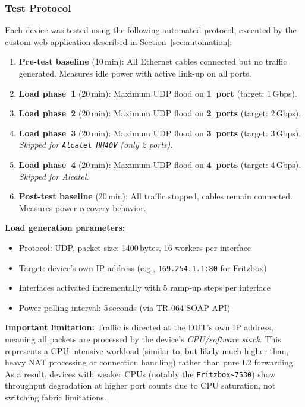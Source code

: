 \subsubsection{Test Protocol}
Each device was tested using the following automated protocol, executed by the custom web application described in Section~\ref{sec:automation}:
\begin{enumerate}
    \item \textbf{Pre-test baseline} (10\,min): All Ethernet cables connected but no traffic generated. Measures idle power with active link-up on all ports.
    \item \textbf{Load phase~1} (20\,min): Maximum \ac{UDP} flood on \textbf{1~port} (target: 1\,Gbps).
    \item \textbf{Load phase~2} (20\,min): Maximum \ac{UDP} flood on \textbf{2~ports} (target: 2\,Gbps).
    \item \textbf{Load phase~3} (20\,min): Maximum \ac{UDP} flood on \textbf{3~ports} (target: 3\,Gbps). \emph{Skipped for \texttt{Alcatel~HH40V} (only 2 ports).}
    \item \textbf{Load phase~4} (20\,min): Maximum \ac{UDP} flood on \textbf{4~ports} (target: 4\,Gbps). \emph{Skipped for Alcatel.}
    \item \textbf{Post-test baseline} (20\,min): All traffic stopped, cables remain connected. Measures power recovery behavior.
\end{enumerate}

\noindent\textbf{Load generation parameters:}
\begin{itemize}
    \item Protocol: \ac{UDP}, packet size: 1400\,bytes, 16 workers per interface
    \item Target: device's own IP address (e.g., \texttt{169.254.1.1:80} for Fritzbox)
    \item Interfaces activated incrementally with 5 ramp-up steps per interface
    \item Power polling interval: 5\,seconds (via TR-064 SOAP \ac{API})
\end{itemize}

\noindent\textbf{Important limitation:} Traffic is directed at the \ac{DUT}'s own IP address, meaning all packets are processed by the device's \emph{\ac{CPU}/software stack}. This represents a \ac{CPU}-intensive workload (similar to, but likely much higher than, heavy NAT processing or connection handling) rather than pure L2 forwarding. As a result, devices with weaker CPUs (notably the \verb|Fritzbox~7530|) show throughput degradation at higher port counts due to \ac{CPU} saturation, not switching fabric limitations.

